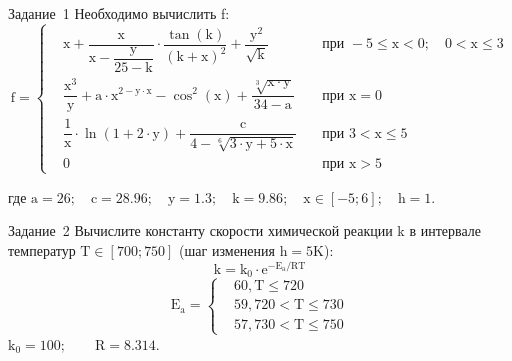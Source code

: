 \documentclass[aspectratio=169]{beamer}	%
\begin{document}
\begin{frame}[fragile]{Задание~1}
\large
Необходимо вычислить f:
\begin{equation*}
\mathrm{
f = \left\{
\begin{aligned}
	& x + \dfrac{x}{x - \dfrac{y}{25 - k}} \cdot \dfrac{\tan \left(k\right)}{\left(k + x\right)^2} + \dfrac{y^2}{\sqrt{k}} &\quad \text{при } -5 \leqslant x < 0; \quad 0 < x \leqslant 3 \\
	& \dfrac{x^3}{y} + a \cdot x ^ {2 - y \cdot x} - \cos^2\left(x\right) + \dfrac{\sqrt[3]{x \cdot y}}{34 - a} &\quad \text{при } x = 0 \\
	& \dfrac{1}{x} \cdot \ln \left(1 + 2 \cdot y\right) + \dfrac{c}{4 - \sqrt[6]{3 \cdot y + 5 \cdot x}} &\quad \text{при } 3 < x \leqslant 5 \\
	& 0 &\quad \text{при } x > 5
\end{aligned}	
\right.}
\end{equation*}

где \quad $\mathrm{a = 26; \quad c = 28.96; \quad y = 1.3; \quad k = 9.86; \quad x \in \left[-5; 6\right]; \quad h = 1}$.
\vfill
\end{frame}


\begin{frame}[fragile]{Задание~2}
\large
Вычислите константу скорости химической реакции k в интервале температур $\mathrm{T \in \left[700; 750\right]}$ (шаг изменения $\mathrm{h = 5 K}$):
\begin{equation*}
	\mathrm{k = k_0 \cdot e^{-E_a / RT}}
\end{equation*}
\begin{equation*}
\mathrm{
	E_a = \left\{
	\begin{aligned}
		& 60, T \leqslant 720 \\
		& 59, 720 < T \leqslant 730 \\
		& 57, 730 < T \leqslant 750
	\end{aligned}
	\right.}
\end{equation*}
$\mathrm{k_0 = 100; \qquad R = 8.314}$.
\vfill
\end{frame}
\end{document}
